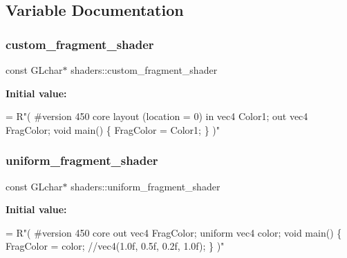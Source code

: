 \subsection{Variable Documentation}
\mbox{\label{namespaceshaders_a53aefc57e61e6526c0469b6790903754}} 
\subsubsection{\texorpdfstring{custom\+\_\+fragment\+\_\+shader}{custom\_fragment\_shader}}
{\footnotesize\ttfamily const G\+Lchar$\ast$ shaders\+::custom\+\_\+fragment\+\_\+shader\hspace{0.3cm}{\ttfamily [static]}}

{\bfseries Initial value\+:}
\begin{DoxyCode}
= R\textcolor{stringliteral}{"(}
\textcolor{stringliteral}{#version 450 core}
\textcolor{stringliteral}{}
\textcolor{stringliteral}{layout (location = 0) in  vec4 Color1;}
\textcolor{stringliteral}{}
\textcolor{stringliteral}{out vec4 FragColor;}
\textcolor{stringliteral}{}
\textcolor{stringliteral}{void main()}
\textcolor{stringliteral}{\{}
\textcolor{stringliteral}{FragColor = Color1;}
\textcolor{stringliteral}{\}}
\textcolor{stringliteral}{)"}
\end{DoxyCode}
\mbox{\label{namespaceshaders_adb630ad693498e928fa4fec5657b7fbd}} 
\subsubsection{\texorpdfstring{uniform\+\_\+fragment\+\_\+shader}{uniform\_fragment\_shader}}
{\footnotesize\ttfamily const G\+Lchar$\ast$ shaders\+::uniform\+\_\+fragment\+\_\+shader\hspace{0.3cm}{\ttfamily [static]}}

{\bfseries Initial value\+:}
\begin{DoxyCode}
= R\textcolor{stringliteral}{"(}
\textcolor{stringliteral}{#version 450 core}
\textcolor{stringliteral}{}
\textcolor{stringliteral}{out vec4 FragColor;}
\textcolor{stringliteral}{}
\textcolor{stringliteral}{uniform vec4 color;}
\textcolor{stringliteral}{}
\textcolor{stringliteral}{void main()}
\textcolor{stringliteral}{\{}
\textcolor{stringliteral}{FragColor = color; //vec4(1.0f, 0.5f, 0.2f, 1.0f);}
\textcolor{stringliteral}{\}}
\textcolor{stringliteral}{)"}
\end{DoxyCode}
